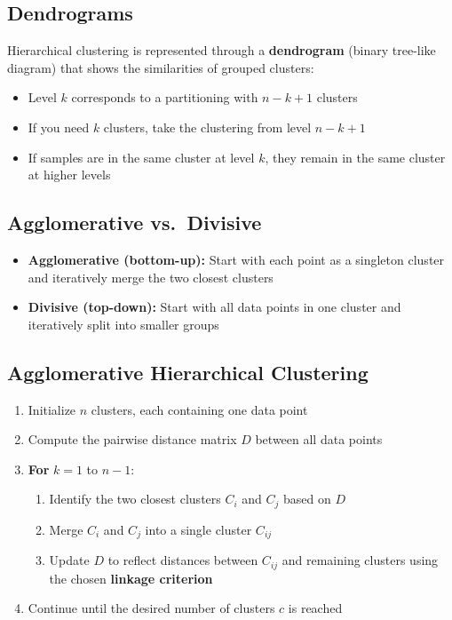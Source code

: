 \documentclass[11pt,a4paper]{article}
\theoremstyle{definition}
\theoremstyle{plain}
\theoremstyle{remark}
\begin{document}
\subsection{Dendrograms}

Hierarchical clustering is represented through a \textbf{dendrogram} (binary tree-like diagram) that shows the similarities of grouped clusters:
\begin{itemize}
    \item Level $k$ corresponds to a partitioning with $n - k + 1$ clusters
    \item If you need $k$ clusters, take the clustering from level $n - k + 1$
    \item If samples are in the same cluster at level $k$, they remain in the same cluster at higher levels
\end{itemize}

\subsection{Agglomerative vs.\ Divisive}

\begin{itemize}
    \item \textbf{Agglomerative (bottom-up):} Start with each point as a singleton cluster and iteratively merge the two closest clusters
    \item \textbf{Divisive (top-down):} Start with all data points in one cluster and iteratively split into smaller groups
\end{itemize}

\subsection{Agglomerative Hierarchical Clustering}

\begin{tcolorbox}[colback=cyan!5!white,colframe=cyan!75!black,title=\textbf{Agglomerative Algorithm}]
\begin{enumerate}
    \item Initialize $n$ clusters, each containing one data point
    \item Compute the pairwise distance matrix $D$ between all data points
    \item \textbf{For} $k = 1$ to $n - 1$:
    \begin{enumerate}
        \item Identify the two closest clusters $C_i$ and $C_j$ based on $D$
        \item Merge $C_i$ and $C_j$ into a single cluster $C_{ij}$
        \item Update $D$ to reflect distances between $C_{ij}$ and remaining clusters using the chosen \textbf{linkage criterion}
    \end{enumerate}
    \item Continue until the desired number of clusters $c$ is reached
\end{enumerate}
\end{tcolorbox}
\end{document}
